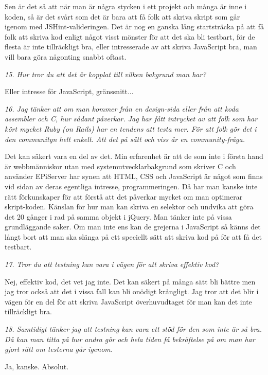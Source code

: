\documentclass[11pt]{article}
\begin{document}
Sen är det så att när man är några stycken i ett projekt och många är inne i koden, så är det svårt som det är bara att få folk att skriva skript som går igenom med JSHint-valideringen. Det är nog en ganska lång startsträcka på att få folk att skriva kod enligt något visst mönster för att det ska bli testbart, för de flesta är inte tillräckligt bra, eller intresserade av att skriva JavaScript bra, man vill bara göra någonting snabbt oftast.

\emph{15. Hur tror du att det är kopplat till vilken bakgrund man har?}

Eller intresse för JavaScript, gränssnitt...

\emph{16. Jag tänker att om man kommer från en design-sida eller från att koda assembler och C, hur sådant påverkar. Jag har fått intrycket av att folk som har kört mycket Ruby (on Rails) har en tendens att testa mer. För att folk gör det i den communityn helt enkelt. Att det på sätt och viss är en community-fråga.}

Det kan säkert vara en del av det. Min erfarenhet är att de som inte i första hand är webbmänniskor utan med systemutvecklarbakgrund som skriver C\nolinebreak\hspace{-.05em}\raisebox{.3ex}{\scriptsize\bf \#} och använder EPiServer har synen att HTML, CSS och JavaScript är något som finns vid sidan av deras egentliga intresse, programmeringen. Då har man kanske inte rätt förkunskaper för att förstå att det påverkar mycket om man optimerar skript-koden. Känslan för hur man kan skriva en selektor och undvika att göra det 20 gånger i rad på samma objekt i jQuery. Man tänker inte på vissa grundläggande saker. Om man inte ens kan de grejerna i JavaScript så känns det långt bort att man ska slänga på ett speciellt sätt att skriva kod på för att få det testbart.

\emph{17. Tror du att testning kan vara i vägen för att skriva effektiv kod?}

Nej, effektiv kod, det vet jag inte. Det kan säkert på många sätt bli bättre men jag tror också att det i vissa fall kan bli onödigt krångligt. Jag tror att det blir i vägen för en del för att skriva JavaScript överhuvudtaget för man kan det inte tillräckligt bra.

\emph{18. Samtidigt tänker jag att testning kan vara ett stöd för den som inte är så bra. Då kan man titta på hur andra gör och hela tiden få bekräftelse på om man har gjort rätt om testerna går igenom.}

Ja, kanske. Absolut.
\end{document}
